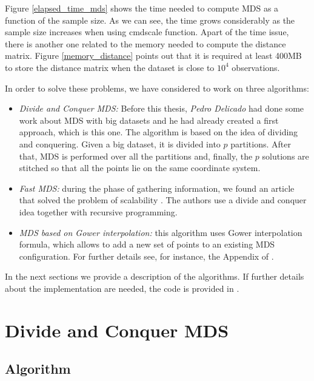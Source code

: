 \documentclass[11pt]{report}
\begin{document}
\indent Figure \ref{elapsed_time_mds} shows the time needed to compute MDS
as a function of the sample size. As we can see, the time grows 
considerably as the sample size increases when using \textsf{cmdscale} function. 
Apart of the time issue, there is another one related to the memory needed to 
compute the distance matrix. Figure \ref{memory_distance} points out 
that it is required at least 400MB to store the distance matrix when the 
dataset is close to $10^4$ observations.

\indent In order to solve these problems, we have considered to work on 
three algorithms:


\begin{itemize}
\item \textit{Divide and Conquer MDS:} Before this thesis, 
\textit{Pedro Delicado} had done some work about  MDS with big
datasets and he had already created a first approach, which is this one. The 
algorithm is based on the idea of dividing and conquering. Given a big dataset, 
it is divided into $p$ partitions. After that, MDS is performed over all the 
partitions and, finally, the $p$ solutions are stitched so that all the points 
lie on the same coordinate system.

\item \textit{Fast MDS:} during the phase of gathering information, we found an 
article that solved the problem of scalability \cite{Yang06afast}. The 
authors  use a divide and conquer idea together with recursive programming. 

\item \textit{MDS based on Gower interpolation:} this algorithm uses
Gower interpolation formula, which allows to add a new set of points
to an existing MDS configuration. For further details see, for instance, the 
Appendix of \cite{gowerHand}. 

\end{itemize}

In the next sections we provide a description of the algorithms. 
If further details about the implementation are needed, the code is provided in 
.

\section{Divide and Conquer MDS}
\subsection{Algorithm}
\end{document}
